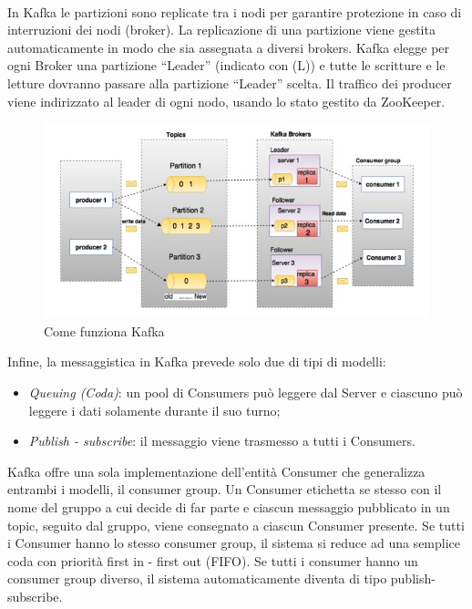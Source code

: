 \\In Kafka le partizioni sono replicate tra i nodi per garantire protezione in caso di interruzioni dei nodi (broker). La replicazione di una partizione viene gestita automaticamente in modo che sia assegnata a diversi brokers. Kafka elegge per ogni Broker una partizione “Leader” (indicato con (L)) e tutte le scritture e le letture dovranno passare alla partizione “Leader” scelta. Il traffico dei producer viene indirizzato al leader di ogni nodo, usando lo stato gestito da ZooKeeper. 
\begin{figure}[H]
\centering
\includegraphics[width=\textwidth]{./images/kafkaArchitetture.jpg}
\caption{Come funziona Kafka}
\label{fig:clusterKafka}
\end{figure}
Infine, la messaggistica in Kafka prevede solo due di tipi di modelli: 
\begin{itemize}
\item \textit{Queuing (Coda)}: un pool di Consumers può leggere dal Server e ciascuno può leggere i dati solamente durante il suo turno; 
\item \textit{Publish - subscribe}: il messaggio viene trasmesso a tutti i Consumers. 
\end{itemize}
Kafka offre una sola implementazione dell'entità Consumer che generalizza entrambi i modelli, il consumer group.  Un Consumer etichetta se stesso con il nome del gruppo a cui decide di far parte e ciascun messaggio pubblicato in un topic, seguito dal gruppo, viene consegnato a ciascun Consumer presente.  Se tutti i Consumer hanno lo stesso consumer group, il sistema si reduce ad una semplice coda con priorità first in - first out (FIFO).  Se tutti i consumer hanno un consumer group diverso, il sistema automaticamente diventa di tipo publish-subscribe.